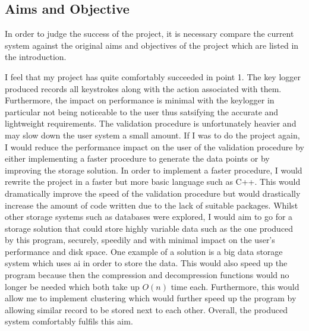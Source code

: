\documentclass[10pt,a4paper]{report}
\begin{document}
\subsection{Aims and Objective}

In order to judge the success of the project, it is necessary compare the current system against the original aims and objectives of the project which are listed in the introduction.

I feel that my project has quite comfortably succeeded in point 1. The key logger produced records all keystrokes along with the action associated with them. Furthermore, the impact on performance is minimal with the keylogger in particular not being noticeable to the user thus satsifying the accurate and lightweight requirements. The validation procedure is unfortunately heavier and may slow down the user system a small amount. If I was to do the project again, I would reduce the performance impact on the user of the validation procedure by either implementing a faster procedure to generate the data points or by improving the storage solution. In order to implement a faster procedure, I would rewrite the project in a faster but more basic language such as C++. This would dramatically improve the speed of the validation procedure but would drastically increase the amount of code written due to the lack of suitable packages. Whilst other storage systems such as databases were explored, I would aim to go for a storage solution that could store highly variable data such as the one produced by this program, securely, speedily and with minimal impact on the user's performance and disk space. One example of a solution is a big data storage system which uses ai in order to store the data. This would also speed up the program because then the compression and decompression functions would no longer be needed which both take up \(O(n)\) time each. Furthermore, this would allow me to implement clustering which would further speed up the program by allowing similar record to be stored next to each other. Overall, the produced system comfortably fulfils this aim.
\end{document}
